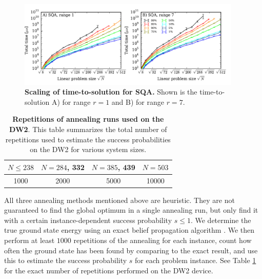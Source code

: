 \begin{figure}[t]
\centering
\includegraphics[width=0.95\textwidth]{chapters/Speedup/sfigures/sfig05_leftover.pdf}
\caption{{\bf Scaling of time-to-solution for SQA.} Shown is the time-to-solution A) for range $r=1$ and B) for range $r=7$.}
\label{fig:scaling_sqa}
\end{figure}

\begin{table}
  \centering
  \begin{tabular}{|c|c|c|c|}\hline
 $N\le 238$ & $N=284$, 332 & $N=385$, 439 & $N=503$ \\ \hline
 1000 & 2000 & 5000 & 10000 \\ \hline
  \end{tabular}
  \caption{{\bf Repetitions of annealing runs used on the DW2}. This table summarizes the total number of repetitions used to estimate the success probabilities on the DW2 for various system sizes.}
  \label{tab:reps}
\end{table}


All three annealing methods mentioned above are heuristic. They are not guaranteed to find the global optimum in a single annealing run, but only find it with a certain instance-dependent success probability $s\leq 1$. We determine the true ground state energy using an exact belief propagation algorithm \cite{dechter1999bucket}. We then perform at least $1000$ repetitions of the annealing for each instance, count how often the ground state has been found by comparing to the exact result, and use this to estimate the success probability $s$ for each problem instance. See Table \ref{tab:reps} for the exact number of repetitions performed on the DW2 device. \\


